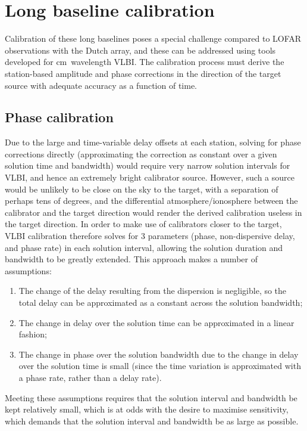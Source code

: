 \documentclass[graybox]{svmult}
\begin{document}
\section{Long baseline calibration}
\label{sec:calibration}

Calibration of these long baselines poses a special challenge compared to LOFAR
observations with the Dutch array, and these can be addressed using tools
developed for cm~wavelength VLBI.  The calibration process must derive the
station-based amplitude and phase corrections in the direction of the target
source with adequate accuracy as a function of time. 

\subsection{Phase calibration}
Due to the large and time-variable delay offsets at each station, solving for
phase corrections directly (approximating the correction as constant over a
given solution time and bandwidth) would require very narrow solution intervals
for VLBI, and hence an extremely bright calibrator source.  However, such a
source would be unlikely to be close on the sky to the target, with a separation
of perhaps tens of degrees, and the differential atmosphere/ionosphere between
the calibrator and the target direction would render the derived calibration
useless in the target direction.  In order to make use of calibrators closer to
the target, VLBI calibration therefore solves for 3 parameters (phase,
non-dispersive delay, and phase rate) in each solution interval, allowing the
solution duration and bandwidth to be greatly extended.  This approach makes a
number of assumptions:

\begin{enumerate}
\item The change of the delay resulting from the dispersion is negligible,
so the total delay can be approximated as a constant across the solution
bandwidth;
\item The change in delay over the solution time can be approximated in a linear
fashion;
\item The change in phase over the solution bandwidth due to the change in delay
over the solution time is small (since the time variation is approximated with a
phase rate, rather than a delay rate).
\end{enumerate}

Meeting these assumptions requires that the solution interval and bandwidth be
kept relatively small, which is at odds with the desire to maximise sensitivity,
which demands that the solution interval and bandwidth be as large as possible.
\end{document}
